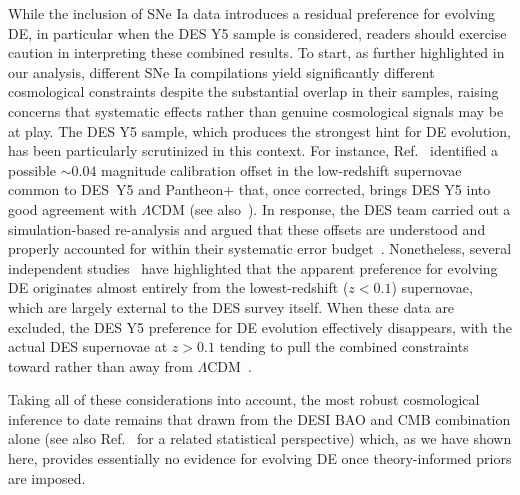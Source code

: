 \documentclass[floats,floatfix,showpacs,amssymb,prd,twocolumn,superscriptaddress,nofootinbib,reprint,preprintnumbers]{revtex4-2}
\begin{document}
While the inclusion of SNe Ia data introduces a residual preference for evolving DE, in particular when the DES Y5 sample is considered, readers should exercise caution in interpreting these combined results. To start, as further highlighted in our analysis, different SNe Ia compilations yield significantly different cosmological constraints despite the substantial overlap in their samples, raising concerns that systematic effects rather than genuine cosmological signals may be at play.  The DES Y5 sample, which produces the strongest hint for DE evolution, has been particularly scrutinized in this context. For instance, Ref.~\cite{Efstathiou:2024xcq} identified a possible $\sim 0.04$ magnitude calibration offset in the low-redshift supernovae common to DES~Y5 and Pantheon+ that, once corrected, brings DES Y5 into good agreement with $\Lambda$CDM (see also~\cite{Huang:2025som}). In response, the DES team carried out a simulation-based re-analysis and argued that these offsets are understood and properly accounted for within their systematic error budget~\cite{DES:2025tir}. Nonetheless, several independent studies~\cite{Gialamas:2024lyw, Notari:2024zmi,DESI:2025zgx,Wang:2025bkk,Huang:2025som, Afroz:2025iwo,  Teixeira:2025czm,Chaudhary:2025vzy} have highlighted that the apparent preference for evolving DE originates almost entirely from the lowest-redshift ($z<0.1$) supernovae, which are largely external to the DES survey itself. When these data are excluded, the DES Y5 preference for DE evolution effectively disappears, with the actual DES supernovae at $z>0.1$ tending to pull the combined constraints toward rather than away from $\Lambda$CDM~\cite{Gialamas:2024lyw, Notari:2024zmi, Wang:2025bkk,Huang:2025som, Chaudhary:2025vzy, Guedezounme:2025wav}.

Taking all of these considerations into account, the most robust cosmological inference to date remains  that drawn from the DESI BAO and CMB combination alone (see also Ref.~\cite{Cortes:2025joz} for a related statistical perspective) which, as we have shown here, provides essentially no evidence for evolving DE once theory-informed priors are imposed.
\end{document}
